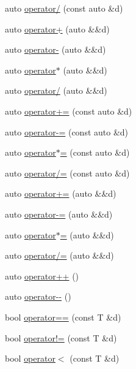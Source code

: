 \begin{DoxyCompactItemize}
auto \hyperlink{classfractal_1_1baggage_a335eab1ed6f72d8c77229d31e78aa2de}{operator/} (const auto \&d)
\item 
auto \hyperlink{classfractal_1_1baggage_a6ad398719ada281520d99e1be3d040fa}{operator+} (auto \&\&d)
\item 
auto \hyperlink{classfractal_1_1baggage_ae897641772b637a6627626be213bc02d}{operator-\/} (auto \&\&d)
\item 
auto \hyperlink{classfractal_1_1baggage_ae5942f4512f10a45d544ab5752beab85}{operator$\ast$} (auto \&\&d)
\item 
auto \hyperlink{classfractal_1_1baggage_adab2ca242795c9a158c4f5948c8e29bb}{operator/} (auto \&\&d)
\item 
auto \hyperlink{classfractal_1_1baggage_ac97b2def4fa217147174cac53fc9cef8}{operator+=} (const auto \&d)
\item 
auto \hyperlink{classfractal_1_1baggage_aee89d99faea56059eb636574ebe20022}{operator-\/=} (const auto \&d)
\item 
auto \hyperlink{classfractal_1_1baggage_ac2a20d1eee27b24b907c33aacc1e0d0e}{operator$\ast$=} (const auto \&d)
\item 
auto \hyperlink{classfractal_1_1baggage_a94e6bca21db663f7fc5822e040ea122a}{operator/=} (const auto \&d)
\item 
auto \hyperlink{classfractal_1_1baggage_a5c290afd60258b17b78f85eee6dc022d}{operator+=} (auto \&\&d)
\item 
auto \hyperlink{classfractal_1_1baggage_a9d314a9b5b55481a6cb7b0aca2289276}{operator-\/=} (auto \&\&d)
\item 
auto \hyperlink{classfractal_1_1baggage_a13ad7848ea0bf14f49efc96149d95261}{operator$\ast$=} (auto \&\&d)
\item 
auto \hyperlink{classfractal_1_1baggage_aedd8c4c77dc0d2804fc5d6374524cd85}{operator/=} (auto \&\&d)
\item 
auto \hyperlink{classfractal_1_1baggage_a7ab638cfc6c7c77d20f84aa99e780da8}{operator++} ()
\item 
auto \hyperlink{classfractal_1_1baggage_a10b87d02b3423000f27c7f0970adffb8}{operator-\/-\/} ()
\item 
bool \hyperlink{classfractal_1_1baggage_ab193ca2ecc402a6f72cde64a12d9844d}{operator==} (const T \&d)
\item 
bool \hyperlink{classfractal_1_1baggage_a50e3b632e7803018ac854dcfd9d9d2f5}{operator!=} (const T \&d)
\item 
bool \hyperlink{classfractal_1_1baggage_a318fcecc8489897592370cf5c2edb588}{operator$<$} (const T \&d)

\end{DoxyCompactItemize}
